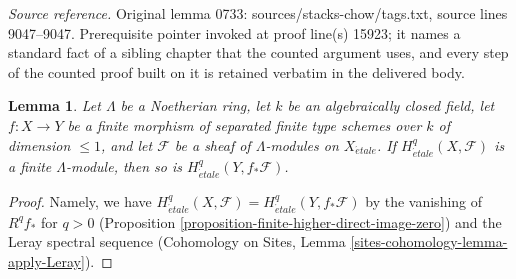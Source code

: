 \documentclass[10pt,a4paper]{amsart}
\theoremstyle{plain}
\newtheorem{lemma}[subsection]{Lemma}
\theoremstyle{definition}
\theoremstyle{remark}
\numberwithin{equation}{subsection}
\def\etale{{\acute{e}tale}}
\begin{document}
\noindent\textit{Source reference.} Original lemma 0733: sources/stacks-chow/tags.txt, source lines 9047--9047. Prerequisite pointer invoked at proof line(s) 15923; it names a standard fact of a sibling chapter that the counted argument uses, and every step of the counted proof built on it is retained verbatim in the delivered body.\par\medskip
\begin{lemma}
\label{lemma-finite-pushforward-coefficients}
Let $\Lambda$ be a Noetherian ring, let $k$ be an algebraically closed field,
let $f : X \to Y$ be a finite morphism of separated finite type schemes
over $k$ of dimension $\leq 1$, and let $\mathcal{F}$ be a sheaf
of $\Lambda$-modules on $X_\etale$. If
$H^q_\etale(X, \mathcal{F})$ is a finite $\Lambda$-module, then
so is $H^q_\etale(Y, f_*\mathcal{F})$.
\end{lemma}

\begin{proof}
Namely, we have $H^q_\etale(X, \mathcal{F}) = H^q_\etale(Y, f_*\mathcal{F})$
by the vanishing of $R^qf_*$ for $q > 0$
(Proposition \ref{proposition-finite-higher-direct-image-zero}) and
the Leray spectral sequence
(Cohomology on Sites, Lemma \ref{sites-cohomology-lemma-apply-Leray}).
\end{proof}
\end{document}
